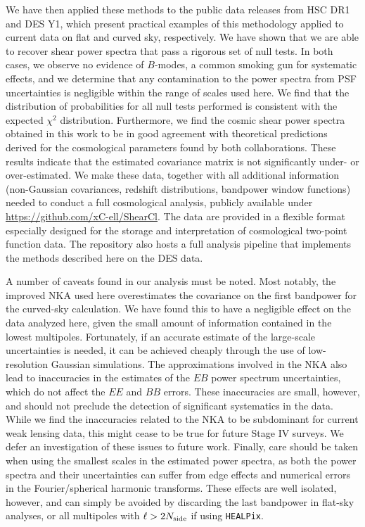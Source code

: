 \documentclass[a4paper,11pt]{article}
\begin{document}
    We have then applied these methods to the public data releases from HSC DR1 and DES Y1, which present practical examples of this methodology applied to current data on flat and curved sky, respectively. We have shown that we are able to recover shear power spectra that pass a rigorous set of null tests. In both cases, we observe no evidence of $B$-modes, a common smoking gun for systematic effects, and we determine that any contamination to the power spectra from PSF uncertainties is negligible within the range of scales used here. We find that the distribution of probabilities for all null tests performed is consistent with the expected $\chi^2$ distribution. Furthermore, we find the cosmic shear power spectra obtained in this work to be in good agreement with theoretical predictions derived for the cosmological parameters found by both collaborations. These results indicate that the estimated covariance matrix is not significantly under- or over-estimated. We make these data, together with all additional information (non-Gaussian covariances, redshift distributions, bandpower window functions) needed to conduct a full cosmological analysis, publicly available under \url{https://github.com/xC-ell/ShearCl}. The data are provided in a flexible format especially designed for the storage and interpretation of cosmological two-point function data. The repository also hosts a full analysis pipeline that implements the methods described here on the DES data.

    A number of caveats found in our analysis must be noted. Most notably, the improved NKA used here overestimates the covariance on the first bandpower for the curved-sky calculation. We have found this to have a negligible effect on the data analyzed here, given the small amount of information contained in the lowest multipoles. Fortunately, if an accurate estimate of the large-scale uncertainties is needed, it can be achieved cheaply through the use of low-resolution Gaussian simulations. The approximations involved in the NKA also lead to inaccuracies in the estimates of the $EB$ power spectrum uncertainties, which do not affect the $EE$ and $BB$ errors. These inaccuracies are small, however, and should not preclude the detection of significant systematics in the data. While we find the inaccuracies related to the NKA to be subdominant for current weak lensing data, this might cease to be true for future Stage IV surveys. We defer an investigation of these issues to future work. Finally, care should be taken when using the smallest scales in the estimated power spectra, as both the power spectra and their uncertainties can suffer from edge effects and numerical errors in the Fourier/spherical harmonic transforms. These effects are well isolated, however, and can simply be avoided by discarding the last bandpower in flat-sky analyses, or all multipoles with $\ell>2N_{\rm side}$ if using {\tt HEALPix}.
\end{document}
